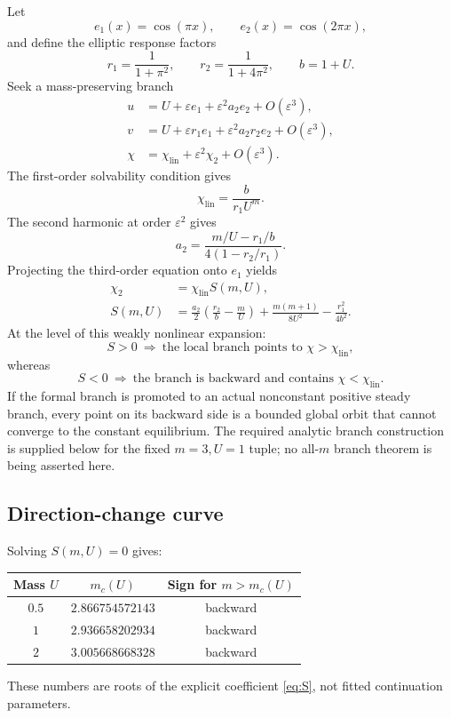 \documentclass[11pt]{article}
\begin{document}
Let
\[
 e_1(x)=\cos(\pi x),\qquad e_2(x)=\cos(2\pi x),
\]
and define the elliptic response factors
\[
 r_1=\frac1{1+\pi^2},\qquad
 r_2=\frac1{1+4\pi^2},\qquad b=1+U.
\]
Seek a mass-preserving branch
\begin{align}
 u&=U+\varepsilon e_1+\varepsilon^2a_2e_2+O(\varepsilon^3), \label{eq:uexp}\\
 v&=U+\varepsilon r_1e_1+\varepsilon^2a_2r_2e_2
       +O(\varepsilon^3),                               \label{eq:vexp}\\
 \chi&=\chi_{\mathrm{lin}}+\varepsilon^2\chi_2
       +O(\varepsilon^3).                               \label{eq:chiexp}
\end{align}
The first-order solvability condition gives
\begin{equation}
 \chi_{\mathrm{lin}}=\frac{b}{r_1U^m}.                  \label{eq:weak-lin}
\end{equation}
The second harmonic at order \(\varepsilon^2\) gives
\begin{equation}
 a_2=
 \frac{m/U-r_1/b}{4(1-r_2/r_1)}.                       \label{eq:a2}
\end{equation}
Projecting the third-order equation onto \(e_1\) yields
\begin{align}
 \chi_2&=\chi_{\mathrm{lin}}S(m,U),                     \label{eq:chi2}\\
 S(m,U)
 &=\frac{a_2}{2}\left(\frac{r_2}{b}-\frac mU\right)
   +\frac{m(m+1)}{8U^2}
   -\frac{r_1^2}{4b^2}.                                \label{eq:S}
\end{align}
At the level of this weakly nonlinear expansion:
\[
  S>0\ \Longrightarrow\ \text{the local branch points to }
       \chi>\chi_{\mathrm{lin}},
\]
whereas
\[
  S<0\ \Longrightarrow\ \text{the branch is backward and contains }
       \chi<\chi_{\mathrm{lin}}.
\]
If the formal branch is promoted to an actual nonconstant positive steady
branch, every point on its backward side is a bounded global orbit that
cannot converge to the constant equilibrium.  The required analytic branch
construction is supplied below for the fixed \(m=3,U=1\) tuple; no
all-\(m\) branch theorem is being asserted here.

\subsection{Direction-change curve}

Solving \(S(m,U)=0\) gives:
\begin{center}
\renewcommand{\arraystretch}{1.15}
\begin{tabular}{@{}ccc@{}}
\toprule
Mass \(U\) & \(m_c(U)\) & Sign for \(m>m_c(U)\)\\
\midrule
\(0.5\) & \(2.866754572143\) & backward\\
\(1\)   & \(2.936658202934\) & backward\\
\(2\)   & \(3.005668668328\) & backward\\
\bottomrule
\end{tabular}
\end{center}
These numbers are roots of the explicit coefficient
\eqref{eq:S}, not fitted continuation parameters.
\end{document}
